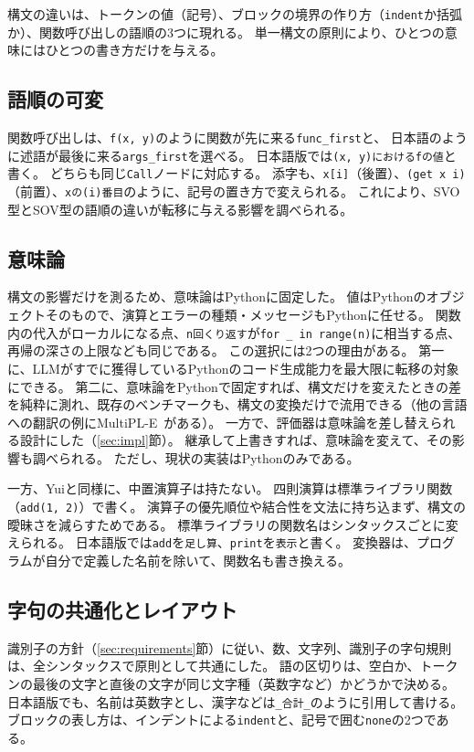 \documentclass{ipsjprosym}
\begin{document}
構文の違いは、トークンの値（記号）、ブロックの境界の作り方（\verb|indent|か括弧か）、関数呼び出しの語順の3つに現れる。
単一構文の原則により、ひとつの意味にはひとつの書き方だけを与える。

\subsection{語順の可変}

関数呼び出しは、\verb|f(x, y)|のように関数が先に来る\verb|func_first|と、
日本語のように述語が最後に来る\verb|args_first|を選べる。
日本語版では\verb|(x, y)におけるfの値|と書く。
どちらも同じ\verb|Call|ノードに対応する。
添字も、\verb|x[i]|（後置）、\verb|(get x i)|（前置）、\verb|xの(i)番目|のように、記号の置き方で変えられる。
これにより、SVO型とSOV型の語順の違いが転移に与える影響を調べられる。

\subsection{意味論}

構文の影響だけを測るため、意味論はPythonに固定した。
値はPythonのオブジェクトそのもので、演算とエラーの種類・メッセージもPythonに任せる。
関数内の代入がローカルになる点、\verb|n回くり返す|が\verb|for _ in range(n)|に相当する点、再帰の深さの上限なども同じである。
この選択には2つの理由がある。
第一に、LLMがすでに獲得しているPythonのコード生成能力を最大限に転移の対象にできる。
第二に、意味論をPythonで固定すれば、構文だけを変えたときの差を純粋に測れ、既存のベンチマークも、構文の変換だけで流用できる（他の言語への翻訳の例にMultiPL-E~\cite{Cassano2023MultiPLE}がある）。
一方で、評価器は意味論を差し替えられる設計にした（\ref{sec:impl}節）。
継承して上書きすれば、意味論を変えて、その影響も調べられる。
ただし、現状の実装はPythonのみである。

一方、Yuiと同様に、中置演算子は持たない。
四則演算は標準ライブラリ関数（\verb|add(1, 2)|）で書く。
演算子の優先順位や結合性を文法に持ち込まず、構文の曖昧さを減らすためである。
標準ライブラリの関数名はシンタックスごとに変えられる。
日本語版では\verb|add|を\verb|足し算|、\verb|print|を\verb|表示|と書く。
変換器は、プログラムが自分で定義した名前を除いて、関数名も書き換える。

\subsection{字句の共通化とレイアウト}

識別子の方針（\ref{sec:requirements}節）に従い、数、文字列、識別子の字句規則は、全シンタックスで原則として共通にした。
語の区切りは、空白か、トークンの最後の文字と直後の文字が同じ文字種（英数字など）かどうかで決める。
日本語版でも、名前は英数字とし、漢字などは\verb|_合計_|のように引用して書ける。
ブロックの表し方は、インデントによる\verb|indent|と、記号で囲む\verb|none|の2つである。
\end{document}
